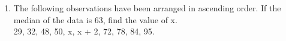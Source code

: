 \renewcommand{\theequation}{\theenumi}
\begin{enumerate}[label=\thesection.\arabic*.,ref=\thesection.\theenumi]
\item The following observations have been arranged
in ascending order. If the median of the data
is 63, find the value of x.\\
29, 32, 48, 50, x, x + 2, 72, 78, 84, 95.

\end{enumerate}